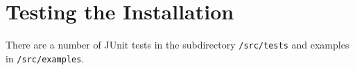 \section{Testing the Installation}

There are a number of JUnit tests in the subdirectory \texttt{/src/tests} and examples in \texttt{/src/examples}.


